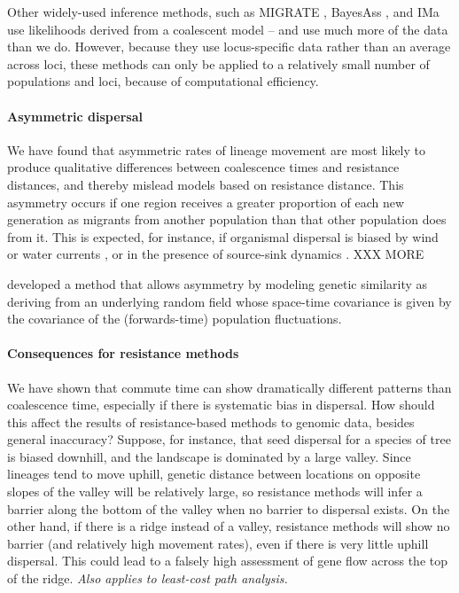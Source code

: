 \documentclass{article}
\newcommand{\plr}[1]{{\em \color{blue} #1}}
\begin{document}
Other widely-used inference methods, such as
MIGRATE \citep{beerli1999maximum,beerli2010unified},
BayesAss \citep{wilson2003bayesian}, 
and IMa \citet{hey2007integration}
use likelihoods derived from a coalescent model --
and use much more of the data than we do.
However, because they use locus-specific data rather than an average across loci,
these methods can only be applied to a relatively small number of populations and loci,
because of computational efficiency.


\paragraph{Asymmetric dispersal}
We have found that asymmetric rates of lineage movement
are most likely to produce qualitative differences between coalescence times and resistance distances,
and thereby mislead models based on resistance distance.
This asymmetry occurs if one region receives a greater proportion of each new generation as migrants
from another population than that other population does from it.
This is expected, for instance,
if organismal dispersal is biased by wind or water currents \citep{gaines2003avoiding,morrissey2009maintenance},
or in the presence of source-sink dynamics \citep{dias1996sources,lenormand2002limits}.
XXX MORE

\citet{hanks2017modeling} developed a method that allows asymmetry
by modeling genetic similarity as deriving from an underlying random field
whose space-time covariance is given by the covariance of the (forwards-time) population fluctuations.


\paragraph{Consequences for resistance methods}
We have shown that commute time can show dramatically different patterns
than coalescence time, especially if there is systematic bias in dispersal.
How should this affect the results of resistance-based methods to genomic data,
besides general inaccuracy?
Suppose, for instance, that seed dispersal for a species of tree
is biased downhill,
and the landscape is dominated by a large valley.
Since lineages tend to move uphill,
genetic distance between locations on opposite slopes of the valley will be relatively large,
so resistance methods will infer a barrier along the bottom of the valley
when no barrier to dispersal exists.
On the other hand, if there is a ridge instead of a valley,
resistance methods will show no barrier (and relatively high movement rates),
even if there is very little uphill dispersal.
This could lead to a falsely high assessment of gene flow across the top of the ridge.
\plr{Also applies to least-cost path analysis.}
\end{document}
